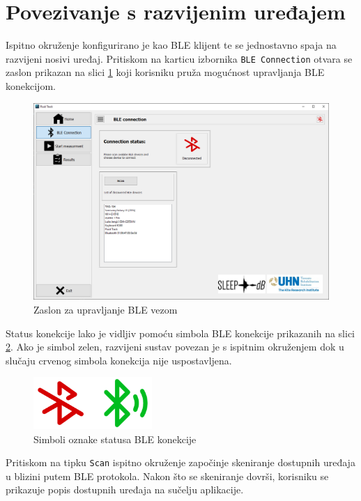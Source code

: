 \documentclass[../diplomski_rad.tex]{subfiles}
\begin{document}
\section{Povezivanje s razvijenim uređajem}

Ispitno okruženje konfigurirano je kao BLE klijent te se jednostavno spaja na razvijeni nosivi uređaj. 
Pritiskom na karticu izbornika \texttt{BLE Connection} otvara se zaslon prikazan na slici \ref{slk:ble} 
koji korisniku pruža mogućnost upravljanja BLE konekcijom.

\begin{figure}[htb]
    \centering
    \includegraphics[width=1\textwidth]{Figures/ble.png} 
    \caption{Zaslon za upravljanje BLE vezom}
    \label{slk:ble}
\end{figure}

Status konekcije lako je vidljiv pomoću simbola BLE konekcije prikazanih na slici \ref{slk:ble_status_simboli}.  
Ako je simbol zelen, razvijeni sustav povezan je s ispitnim okruženjem dok u slučaju crvenog simbola konekcija nije uspostavljena.

\begin{figure}[htb]
    \centering
    \includegraphics[width=0.4\textwidth]{Figures/ble_status_simboli.png} 
    \caption{Simboli oznake statusa BLE konekcije \cite{ikone}}
    \label{slk:ble_status_simboli}
\end{figure}

Pritiskom na tipku \texttt{Scan}  ispitno okruženje započinje skeniranje dostupnih uređaja 
u blizini putem BLE protokola. 
Nakon što se skeniranje dovrši, korisniku se prikazuje popis dostupnih uređaja na sučelju aplikacije.
\end{document}
